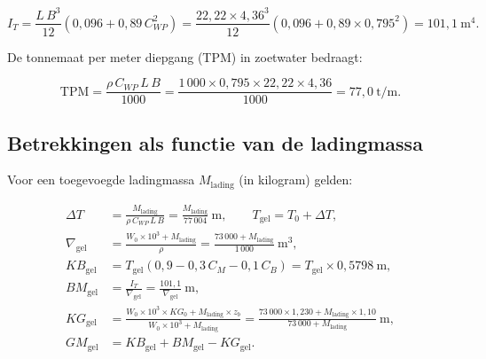 \begin{equation}
    I_T = \frac{L\,B^3}{12}\!\left(0{,}096 + 0{,}89\,C_{WP}^{2}\right)
        = \frac{22{,}22 \times 4{,}36^3}{12}\!\left(0{,}096 + 0{,}89 \times 0{,}795^2\right)
        = 101{,}1\ \mathrm{m}^4.
    \label{eq:IT}
\end{equation}
 
De tonnemaat per meter diepgang (TPM) in zoetwater bedraagt:
 
\begin{equation}
    \mathrm{TPM} = \frac{\rho\,C_{WP}\,L\,B}{1000}
               = \frac{1\,000 \times 0{,}795 \times 22{,}22 \times 4{,}36}{1000}
               = 77{,}0\ \mathrm{t/m}.
    \label{eq:TPM}
\end{equation}
 
\subsection{Betrekkingen als functie van de ladingmassa}
 
Voor een toegevoegde ladingmassa $M_\mathrm{lading}$ (in kilogram) gelden:
 
\begin{align}
    \Delta T &= \frac{M_\mathrm{lading}}{\rho\,C_{WP}\,L\,B}
              = \frac{M_\mathrm{lading}}{77\,004}\ \mathrm{m},
    \qquad
    T_\mathrm{gel} = T_0 + \Delta T,
    \label{eq:deltaT} \\[6pt]
    \nabla_\mathrm{gel} &= \frac{W_0 \times 10^3 + M_\mathrm{lading}}{\rho}
                        = \frac{73\,000 + M_\mathrm{lading}}{1\,000}\ \mathrm{m}^3,
    \label{eq:nabla-gel} \\[6pt]
    KB_\mathrm{gel} &= T_\mathrm{gel}\!\left(0{,}9 - 0{,}3\,C_M - 0{,}1\,C_B\right)
                    = T_\mathrm{gel} \times 0{,}5798\ \mathrm{m},
    \label{eq:KB-gel} \\[6pt]
    BM_\mathrm{gel} &= \frac{I_T}{\nabla_\mathrm{gel}}
                    = \frac{101{,}1}{\nabla_\mathrm{gel}}\ \mathrm{m},
    \label{eq:BM-gel} \\[6pt]
    KG_\mathrm{gel} &= \frac{W_0 \times 10^3 \times KG_0 + M_\mathrm{lading} \times z_b}
                             {W_0 \times 10^3 + M_\mathrm{lading}}
                      = \frac{73\,000 \times 1{,}230 + M_\mathrm{lading} \times 1{,}10}
                             {73\,000 + M_\mathrm{lading}}\ \mathrm{m},
    \label{eq:KG-gel} \\[6pt]
    GM_\mathrm{gel} &= KB_\mathrm{gel} + BM_\mathrm{gel} - KG_\mathrm{gel}.
    \label{eq:GM-gel}
\end{align}
 
